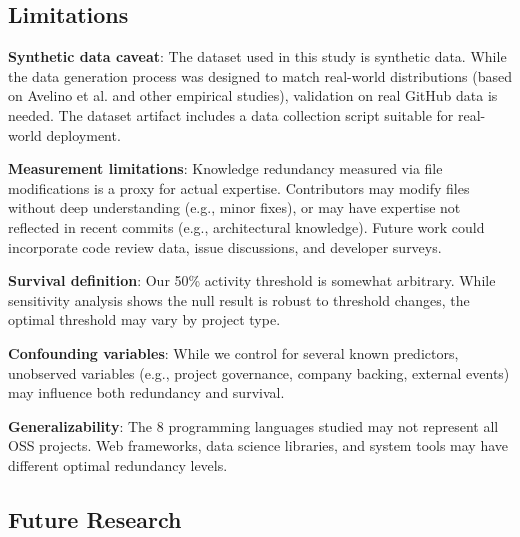 \documentclass[11pt,letterpaper]{article}
\begin{document}
\subsection{Limitations}
\label{sec:limitations}

\textbf{Synthetic data caveat}: The dataset used in this study is synthetic data. While the data generation process was designed to match real-world distributions (based on Avelino et al. \cite{Avelino2019} and other empirical studies), validation on real GitHub data is needed. The dataset artifact includes a data collection script suitable for real-world deployment.

\textbf{Measurement limitations}: Knowledge redundancy measured via file modifications is a proxy for actual expertise. Contributors may modify files without deep understanding (e.g., minor fixes), or may have expertise not reflected in recent commits (e.g., architectural knowledge). Future work could incorporate code review data, issue discussions, and developer surveys.

\textbf{Survival definition}: Our 50\% activity threshold is somewhat arbitrary. While sensitivity analysis shows the null result is robust to threshold changes, the optimal threshold may vary by project type.

\textbf{Confounding variables}: While we control for several known predictors, unobserved variables (e.g., project governance, company backing, external events) may influence both redundancy and survival.

\textbf{Generalizability}: The 8 programming languages studied may not represent all OSS projects. Web frameworks, data science libraries, and system tools may have different optimal redundancy levels.

\subsection{Future Research}
\end{document}
